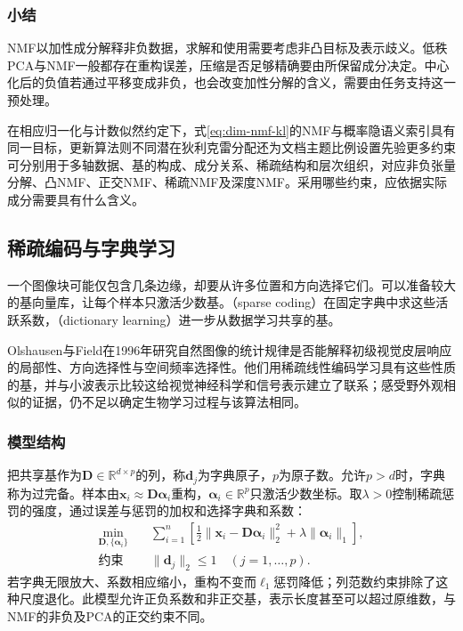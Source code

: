 \subsubsection{小结}
\label{sec:dim-nmf-summary}

NMF以加性成分解释非负数据，求解和使用需要考虑非凸目标及表示歧义。低秩PCA与NMF一般都存在重构误差，压缩是否足够精确要由所保留成分决定。中心化后的负值若通过平移变成非负，也会改变加性分解的含义，需要由任务支持这一预处理。

在相应归一化与计数似然约定下，式\eqref{eq:dim-nmf-kl}的NMF与概率隐语义索引具有同一目标，更新算法则不同潜在狄利克雷分配还为文档主题比例设置先验更多约束可分别用于多轴数据、基的构成、成分关系、稀疏结构和层次组织，对应非负张量分解、凸NMF、正交NMF、稀疏NMF及深度NMF。采用哪些约束，应依据实际成分需要具有什么含义。

\subsection{稀疏编码与字典学习}
\label{sec:dim-sparse-coding}

一个图像块可能仅包含几条边缘，却要从许多位置和方向选择它们。可以准备较大的基向量库，让每个样本只激活少数基。（sparse coding）在固定字典中求这些活跃系数，（dictionary learning）进一步从数据学习共享的基。

Olshausen与Field在1996年研究自然图像的统计规律是否能解释初级视觉皮层响应的局部性、方向选择性与空间频率选择性。他们用稀疏线性编码学习具有这些性质的基，并与小波表示比较这给视觉神经科学和信号表示建立了联系；感受野外观相似的证据，仍不足以确定生物学习过程与该算法相同。

\subsubsection{模型结构}
\label{sec:dim-sparse-coding-structure}

把共享基作为$\bm{D}\in\mathbb{R}^{d\times p}$的列，称$\bm{d}_j$为字典原子，$p$为原子数。允许$p>d$时，字典称为过完备。样本由$\bm{x}_i\approx\bm{D}\bm{\alpha}_i$重构，$\bm{\alpha}_i\in\mathbb{R}^{p}$只激活少数坐标。取$\lambda>0$控制稀疏惩罚的强度，通过误差与惩罚的加权和选择字典和系数：
\begin{equation}
  \begin{aligned}
  \min_{\bm{D},\{\bm{\alpha}_i\}}\quad&
   \sum_{i=1}^{n}\left[
      \tfrac12\lVert\bm{x}_i-\bm{D}\bm{\alpha}_i\rVert_2^2
      +\lambda\lVert\bm{\alpha}_i\rVert_1\right],\\
  \text{约束}\quad&\lVert\bm{d}_j\rVert_2\leq1
                 \quad(j=1,\ldots,p).
  \end{aligned}
  \label{eq:dim-dictionary-objective}
\end{equation}
若字典无限放大、系数相应缩小，重构不变而$\ell_1$惩罚降低；列范数约束排除了这种尺度退化。此模型允许正负系数和非正交基，表示长度甚至可以超过原维数，与NMF的非负及PCA的正交约束不同。


